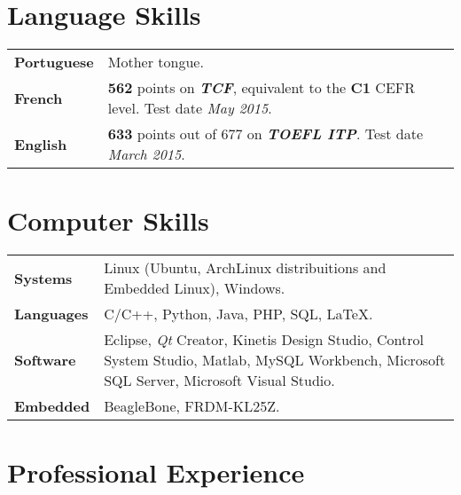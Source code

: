 \documentclass[10pt, a4paper]{article}
\begin{document}


\section{Language Skills}

\begin{tabular}{p{} p{}}

\textbf{Portuguese} & Mother tongue.\\ 

\textbf{French} & \textbf{562} points on \textbf{\textit{TCF}},
equivalent to the \textbf{C1} CEFR level. Test date \textit{May 2015}.
\\

\textbf{English} & \textbf{633} points out of 677 on \textbf{\textit{TOEFL
ITP}}. Test date \textit{March 2015}.
\\

\end{tabular}


\section{Computer Skills}

\begin{tabular}{p{} p{}}

 \textbf{Systems} & Linux (Ubuntu, ArchLinux distribuitions and Embedded Linux),
 Windows.
 \\

 \textbf{Languages} & C/C++, Python, Java, PHP, SQL, \LaTeX.
 \\
 
 \textbf{Software} & Eclipse, \textit{Qt} Creator, Kinetis Design Studio,
 Control System Studio, Matlab, MySQL Workbench, Microsoft SQL Server, Microsoft
 Visual Studio.\\
 
  \textbf{Embedded} & BeagleBone, FRDM-KL25Z. \\
\end{tabular}



\section{Professional Experience}
\end{document}
